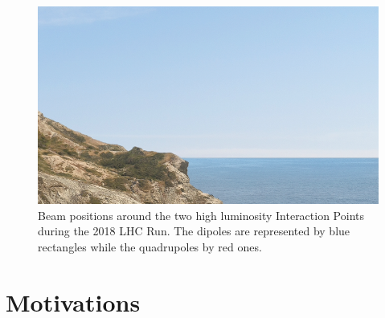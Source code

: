 
\begin{figure}[h]
  \centering
  \includegraphics[width=0.5\linewidth]{Figures/placeholder.png}
  \caption{Beam positions around the two high luminosity Interaction Points during the 2018 LHC Run. The dipoles are represented by blue rectangles while the quadrupoles by red ones.}
  \label{fig:ir1_ir5_beam_positions}
\end{figure}


\section{Motivations}

